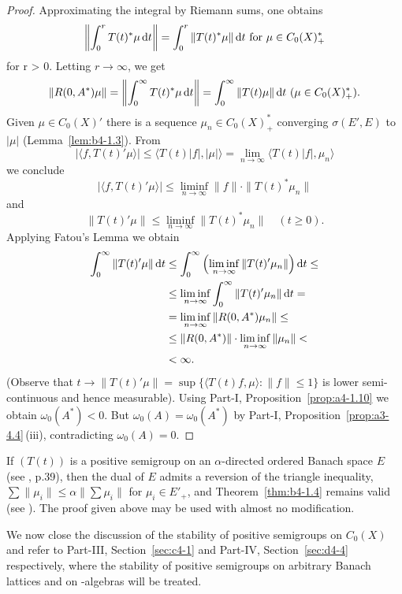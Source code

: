 \begin{proof}
Approximating the integral by Riemann sums, one obtains 
\[
   \left\|\int_0^r T(t)^*\mu \mathop{}\!\mathrm{d}{t}\right\| = \int_0^r \|T(t)^*\mu\| \mathop{}\!\mathrm{d}{t} \text{ for } \mu \in C_{0}(X)^*_{+}
\]
for r  >  0.
Letting $r \to \infty$, we get
\[
    \|R(0,A^*)\mu\| = \left\|\int_0^{\infty} T(t)^*\mu \mathop{}\!\mathrm{d}{t}\right\| 
    = \int_0^{\infty} \|T(t)\mu\| \mathop{}\!\mathrm{d}{t}\  (\mu \in C_{0}(X)_{+}^{*}) .
\]
Given $\mu \in C_{0}(X)'$ there is a sequence $\mu_n \in C_{0}(X)^*_+$ converging $\sigma(E',E)$ to $|\mu|$ (Lemma~\ref{lem:b4-1.3}).
From 
%
\[
	 |\langle f,T(t)'\mu \rangle| \leq \langle T(t)|f|,|\mu| \rangle = \lim_{n\to\infty} \langle T(t)|f|,\mu_n \rangle 
\]
%
we conclude 
%
\[
	 |\langle f,T(t)'\mu \rangle| \leq \liminf_{n\to\infty}\|f\| \cdot \|T(t)^*\mu_n\| 
\]
%
and 
%
\[
	 \|T(t)'\mu\| \leq \liminf_{n\to\infty}\|T(t)^*\mu_n\| \quad (t \geq 0) .
\]
%
Applying Fatou's Lemma we obtain 
\[
\begin{aligned}
	\int_0^{\infty} \|T(t)'\mu\| \dt 
         &\leq \int_0^{\infty} \left(\liminf_{n\to\infty} \|T(t)'\mu_n\|\right) \dt \leq\\
         &\leq  	\liminf_{n\to\infty} \int_0^{\infty} \|T(t)'\mu_n\| \dt = \\ 
         & = \liminf_{n\to\infty} \|R(0,A^{*})\mu_n\| \leq \\
         &\leq \|R(0,A^{*})\|\cdot\liminf_{n\to\infty} \|\mu_n\| < \\
         &< \infty .
\end{aligned}
\]
(Observe that $t \to \|T(t)'\mu\| = \sup \{\langle T(t)f,\mu \rangle \colon \|f\| \leq 1\}$ is lower semi-continuous and hence measurable). 
Using Part-I, Proposition~\ref{prop:a4-1.10} we obtain $\omega_{0}(A^{*})<0$. 
But $\omega_{0}(A) = \omega_{0}(A^{*})$ by Part-I, Proposition~\ref{prop:a3-4.4}\,(iii), contradicting $\omega_{0}(A) = 0$.
\end{proof}
\begin{remark}\label{rem:b4-1.5}%
If\/ $(T(t))$ is a positive semigroup on an $\alpha$-directed ordered Banach space $E$ (see \textcite{asimow:1980}, p.39), 
then the dual of\/ $E$ admits a reversion of the triangle inequality, 
\ie $\sum\|\mu_i\| \leq \alpha\|\sum\mu_i\|$ 
for $\mu_i \in E'_+$, 
and Theorem~\ref{thm:b4-1.4} remains valid (see \textcite{battydavies:1983}). 
The proof given above may be used with almost no modification.
\end{remark}
We now close the discussion of the stability of positive semigroups on $C_{0}(X)$ and refer to Part-III, Section~\ref{sec:c4-1} and Part-IV, Section~\ref{sec:d4-4}  respectively, where the stability of positive semigroups on arbitrary Banach lattices and on \CA-algebras will be treated.
